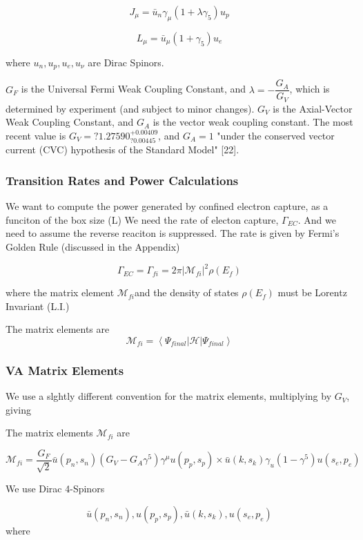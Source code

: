 \documentclass[11pt]{amsart}
\begin{document}
$$J_{\mu}=\bar{u}_{n}\gamma_{\mu}(1+\lambda\gamma_{5})u_{p}$$

$$L_{\mu}=\bar{u}_{\mu}(1+\gamma_{5})u_{e}$$

where $u_{n},u_{p},u_{e},u_{\nu}$ are Dirac Spinors.

$G_{F}$ is the Universal Fermi Weak Coupling Constant, and $\lambda=-\dfrac{G_{A}}{G_{V}}$, which is determined by experiment (and subject to minor changes).  $G_{V}$ is the Axial-Vector Weak Coupling Constant, and $G_{A}$ is the vector weak coupling
constant.  The most recent value is $G_{V}=?1.27590^{+0.00409}_{?0.00445}$, and $G_{A}=1$ "under the conserved vector current (CVC) hypothesis of the Standard Model" [22].
 
\subsubsection{Transition Rates and Power Calculations}

We want to compute the power generated by confined electron capture, as a funciton of the box size (L)
We need the  rate of electon capture, $\Gamma_{EC}$.  And we need to assume the reverse reaciton is suppressed.  The rate is given by Fermi's Golden Rule (discussed in the Appendix)

$$\Gamma_{EC}=\Gamma_{fi}=2\pi|\mathcal{M}_{fi}|^{2}\rho(E_{f})$$

where the matrix element $\mathcal{M}_{fi}$and the density of states $\rho(E_{f})$ must be Lorentz Invariant (L.I.)

The matrix elements are 
$$\mathcal{M}_{fi}=\left<\Psi_{final}\big\vert\mathcal{H}\big\vert\Psi_{final}\right>$$


\subsubsection{VA Matrix Elements}

We use a slghtly different convention for the matrix elements, multiplying by $G_{V}$, giving

The matrix elements $\mathcal{M}_{fi}$ are

$$\mathcal{M}_{fi}=\dfrac{G_{F}}{\sqrt{2}}\bar{u}(p_{n},s_{n})(G_{V}-G_{A}\gamma^{5})\gamma^{\mu}u(p_{p},s_{p})\times\bar{u}(k,s_{k})\gamma_{u}(1-\gamma^{5})u(s_{e},p_{e})$$


We use Dirac 4-Spinors

$$\bar{u}(p_{n},s_{n}),u(p_{p},s_{p}),\bar{u}(k,s_{k}),u(s_{e},p_{e})$$
where
\end{document}
